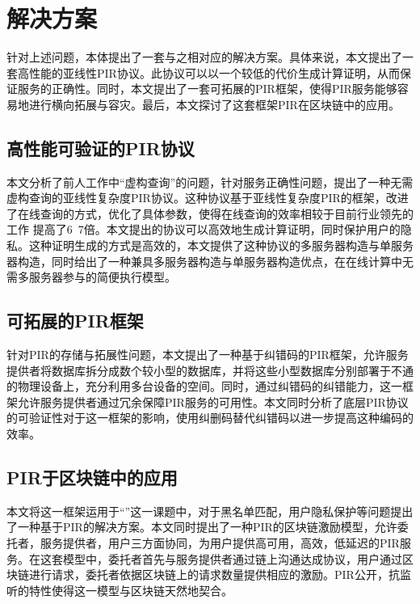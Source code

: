 \section{解决方案}
针对上述问题，本体提出了一套与之相对应的解决方案。具体来说，本文提出了一套高性能的亚线性PIR协议。此协议可以以一个较低的代价生成计算证明，从而保证服务的正确性。同时，本文提出了一套可拓展的PIR框架，使得PIR服务能够容易地进行横向拓展与容灾。最后，本文探讨了这套框架PIR在区块链中的应用。
\subsection{高性能可验证的PIR协议}
本文分析了前人工作中“虚构查询”的问题，针对服务正确性问题，提出了一种无需虚构查询的亚线性复杂度PIR协议。这种协议基于亚线性复杂度PIR的框架，改进了在线查询的方式，优化了具体参数，使得在线查询的效率相较于目前行业领先的工作 \cite{TreePIR,Piano} 提高了6~7倍。本文提出的协议可以高效地生成计算证明，同时保护用户的隐私。这种证明生成的方式是高效的，本文提供了这种协议的多服务器构造与单服务器构造，同时给出了一种兼具多服务器构造与单服务器构造优点，在在线计算中无需多服务器参与的简便执行模型。
\subsection{可拓展的PIR框架}
针对PIR的存储与拓展性问题，本文提出了一种基于纠错码的PIR框架，允许服务提供者将数据库拆分成数个较小型的数据库，并将这些小型数据库分别部署于不通的物理设备上，充分利用多台设备的空间。同时，通过纠错码的纠错能力，这一框架允许服务提供者通过冗余保障PIR服务的可用性。本文同时分析了底层PIR协议的可验证性对于这一框架的影响，使用纠删码替代纠错码以进一步提高这种编码的效率。

\subsection{PIR于区块链中的应用}
本文将这一框架运用于“\projectname”这一课题中，对于黑名单匹配，用户隐私保护等问题提出了一种基于PIR的解决方案。本文同时提出了一种PIR的区块链激励模型，允许委托者，服务提供者，用户三方面协同，为用户提供高可用，高效，低延迟的PIR服务。在这套模型中，委托者首先与服务提供者通过链上沟通达成协议，用户通过区块链进行请求，委托者依据区块链上的请求数量提供相应的激励。PIR公开，抗监听的特性使得这一模型与区块链天然地契合。